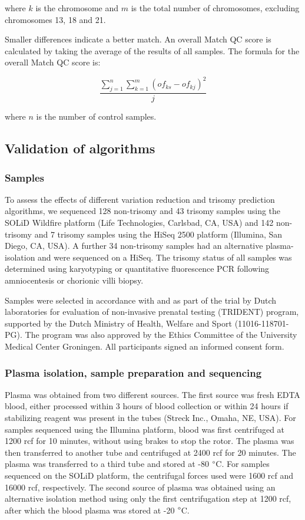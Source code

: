 \noindent where $k$ is the chromosome and $m$ is the total number of chromosomes, excluding chromosomes 13, 18 and 21.

Smaller differences indicate a better match. 
An overall Match QC score is calculated by taking the average of the results of all samples. The formula for the overall Match QC score is:

\begin{equation*}
	\frac{\sum^n_{j=1}\sum^m_{k=1}(of_{ks} - of_{kj})^2}{j}
\end{equation*}

\noindent where $n$ is the number of control samples.

\subsection{Validation of algorithms}
\subsubsection{Samples}
To assess the effects of different variation reduction and trisomy prediction algorithms, we sequenced 128 non-trisomy and 43 trisomy samples using the SOLiD Wildfire platform (Life Technologies, Carlsbad, CA, USA) and 142 non-trisomy and 7 trisomy samples using the HiSeq 2500 platform (Illumina, San Diego, CA, USA). 
A further 34 non-trisomy samples had an alternative plasma-isolation and were sequenced on a HiSeq. 
The trisomy status of all samples was determined using karyotyping or quantitative fluorescence PCR following amniocentesis or chorionic villi biopsy.

Samples were selected in accordance with and as part of the trial by Dutch laboratories for evaluation of non-invasive prenatal testing (TRIDENT) program, supported by the Dutch Ministry of Health, Welfare and Sport (11016-118701-PG). 
The program was also approved by the Ethics Committee of the University Medical Center Groningen. 
All participants signed an informed consent form.

\subsubsection{Plasma isolation, sample preparation and sequencing}
Plasma was obtained from two different sources. 
The first source was fresh EDTA blood, either processed within 3 hours of blood collection or within 24 hours if stabilizing reagent was present in the tubes (Streck Inc., Omaha, NE, USA). 
For samples sequenced using the Illumina platform, blood was first centrifuged at 1200 rcf for 10 minutes, without using brakes to stop the rotor. 
The plasma was then transferred to another tube and centrifuged at 2400 rcf for 20 minutes. The plasma was transferred to a third tube and stored at -80 $\degree$C. 
For samples sequenced on the SOLiD platform, the centrifugal forces used were 1600 rcf and 16000 rcf, respectively. 
The second source of plasma was obtained using an alternative isolation method using only the first centrifugation step at 1200 rcf, after which the blood plasma was stored at -20 $\degree$C.

